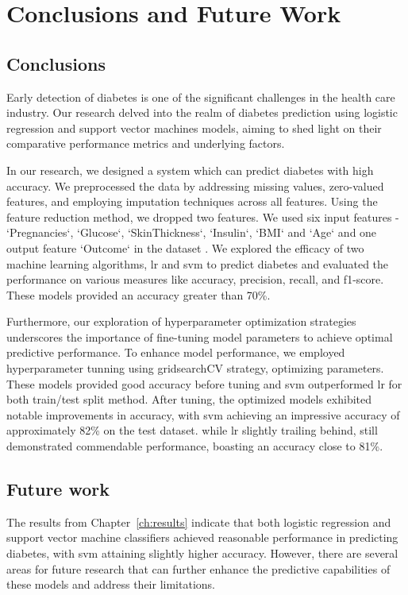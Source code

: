 \chapter{Conclusions and Future Work}
\label{ch:con}
\section{Conclusions}
Early detection of diabetes is one of the significant challenges in the health care industry. Our research delved into the realm of diabetes prediction using logistic regression and support vector machines models, aiming to shed light on their comparative performance metrics and underlying factors. 

In our research, we designed a system which can predict diabetes with high accuracy. We preprocessed the data by addressing missing values, zero-valued features, and employing imputation techniques across all features. Using the feature reduction method, we dropped two features. We used six input features - `Pregnancies`, `Glucose`, `SkinThickness`, `Insulin`, `BMI` and `Age` and one output feature `Outcome` in the  dataset \citep{dataset}. We explored the efficacy of two machine learning algorithms, lr and svm to predict diabetes and evaluated the performance on various measures like accuracy, precision, recall, and f1-score. These models provided an accuracy greater than 70\%.

Furthermore, our exploration of hyperparameter optimization strategies underscores the importance of fine-tuning model parameters to achieve optimal predictive performance. To enhance model performance, we employed hyperparameter tunning using gridsearchCV strategy, optimizing parameters. These models provided good accuracy before tuning and svm outperformed lr for both train/test split method. After tuning, the optimized models exhibited notable improvements in accuracy, with svm achieving an impressive accuracy of approximately 82\% on the test dataset. while lr slightly trailing behind, still demonstrated commendable performance, boasting an accuracy close to 81\%.

\section{Future work}
The results from Chapter~\ref{ch:results} indicate that both logistic regression and support vector machine classifiers achieved reasonable performance in predicting diabetes, with svm attaining slightly higher accuracy. However, there are several areas for future research that can further enhance the predictive capabilities of these models and address their limitations.

